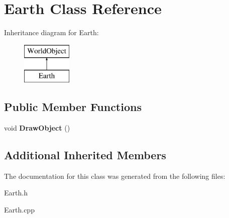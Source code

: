 \hypertarget{class_earth}{\section{Earth Class Reference}
\label{class_earth}
}
Inheritance diagram for Earth\+:\begin{figure}[H]
\begin{center}
\leavevmode
\includegraphics[height=2.000000cm]{class_earth}
\end{center}
\end{figure}
\subsection*{Public Member Functions}
\begin{DoxyCompactItemize}
\item 
\hypertarget{class_earth_a3e7410e27847c21aa17b4322103d1e00}{void {\bfseries Draw\+Object} ()}\label{class_earth_a3e7410e27847c21aa17b4322103d1e00}

\end{DoxyCompactItemize}
\subsection*{Additional Inherited Members}


The documentation for this class was generated from the following files\+:\begin{DoxyCompactItemize}
\item 
Earth.\+h\item 
Earth.\+cpp\end{DoxyCompactItemize}
